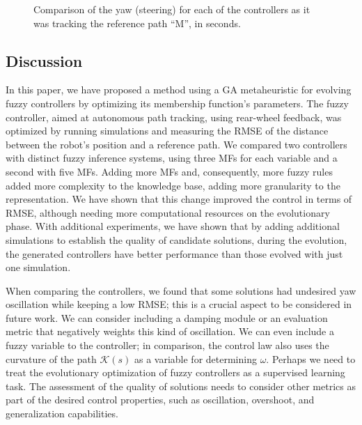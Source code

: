 \documentclass[symmetry,article,submit,moreauthors,pdftex]{Definitions/mdpi}
\begin{document}
\begin{figure}[h]
     \caption{Comparison of the yaw (steering) for each of the controllers as it was tracking the reference path ``M'', in seconds.}
        \label{fig:yaw}
\end{figure}
\begin{paracol}{2}
\linenumbers
\switchcolumn
\section{Discussion}\label{Discussion}

In this paper, we have proposed a method using a GA metaheuristic for evolving
fuzzy controllers by optimizing its membership function's parameters.  The
fuzzy controller, aimed at autonomous path tracking, using rear-wheel feedback,
was optimized by running simulations and measuring the RMSE of the distance
between the robot's position and a reference path. We compared two controllers
with distinct fuzzy inference systems, using three MFs for each variable and a
second with five MFs. Adding more MFs and, consequently, more fuzzy rules added
more complexity to the knowledge base, adding more granularity to the
representation.  We have shown that this change improved the control in terms
of RMSE, although needing more computational resources on the evolutionary
phase. With additional experiments, we have shown that by adding additional
simulations to establish the quality of candidate solutions, during the
evolution, the generated controllers have better performance than those evolved
with just one simulation.

When comparing the controllers, we found that some solutions had undesired yaw
oscillation while keeping a low RMSE; this is a crucial aspect to be considered
in future work. We can consider including a damping module or an evaluation
metric that negatively weights this kind of oscillation. We can even include a
fuzzy variable to the controller; in comparison, the control law also uses the
curvature of the path $\mathcal{K}(s)$ as a variable for determining $\omega$.
Perhaps we need to treat the evolutionary optimization of fuzzy controllers as
a supervised learning task. The assessment of the quality of solutions needs to
consider other metrics as part of the desired control properties, such as
oscillation, overshoot, and generalization capabilities.



\end{paracol}
\end{document}
